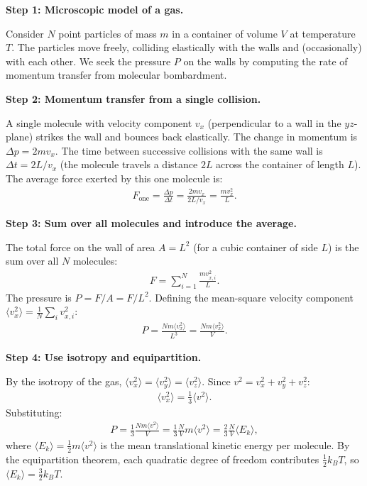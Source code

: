 \textbf{Step 1: Microscopic model of a gas.}

Consider $N$ point particles of mass $m$ in a container of volume $V$ at temperature $T$. The particles move freely, colliding elastically with the walls and (occasionally) with each other. We seek the pressure $P$ on the walls by computing the rate of momentum transfer from molecular bombardment.

\textbf{Step 2: Momentum transfer from a single collision.}

A single molecule with velocity component $v_x$ (perpendicular to a wall in the $yz$-plane) strikes the wall and bounces back elastically. The change in momentum is $\Delta p = 2mv_x$. The time between successive collisions with the same wall is $\Delta t = 2L/v_x$ (the molecule travels a distance $2L$ across the container of length $L$). The average force exerted by this one molecule is:
\begin{align}
F_{\text{one}} = \frac{\Delta p}{\Delta t} = \frac{2mv_x}{2L/v_x} = \frac{mv_x^2}{L}.
\end{align}

\textbf{Step 3: Sum over all molecules and introduce the average.}

The total force on the wall of area $A = L^2$ (for a cubic container of side $L$) is the sum over all $N$ molecules:
\begin{align}
F = \sum_{i=1}^{N}\frac{mv_{x,i}^2}{L}.
\end{align}
The pressure is $P = F/A = F/L^2$. Defining the mean-square velocity component $\langle v_x^2\rangle = \frac{1}{N}\sum_i v_{x,i}^2$:
\begin{align}
P = \frac{N m\langle v_x^2\rangle}{L^3} = \frac{Nm\langle v_x^2\rangle}{V}.
\end{align}

\textbf{Step 4: Use isotropy and equipartition.}

By the isotropy of the gas, $\langle v_x^2\rangle = \langle v_y^2\rangle = \langle v_z^2\rangle$. Since $v^2 = v_x^2 + v_y^2 + v_z^2$:
\begin{align}
\langle v_x^2\rangle = \frac{1}{3}\langle v^2\rangle.
\end{align}
Substituting:
\begin{align}
P = \frac{1}{3}\frac{Nm\langle v^2\rangle}{V} = \frac{1}{3}\frac{N}{V}m\langle v^2\rangle = \frac{2}{3}\frac{N}{V}\langle E_k\rangle,
\end{align}
where $\langle E_k\rangle = \frac{1}{2}m\langle v^2\rangle$ is the mean translational kinetic energy per molecule. By the equipartition theorem, each quadratic degree of freedom contributes $\frac{1}{2}k_BT$, so $\langle E_k\rangle = \frac{3}{2}k_BT$.

